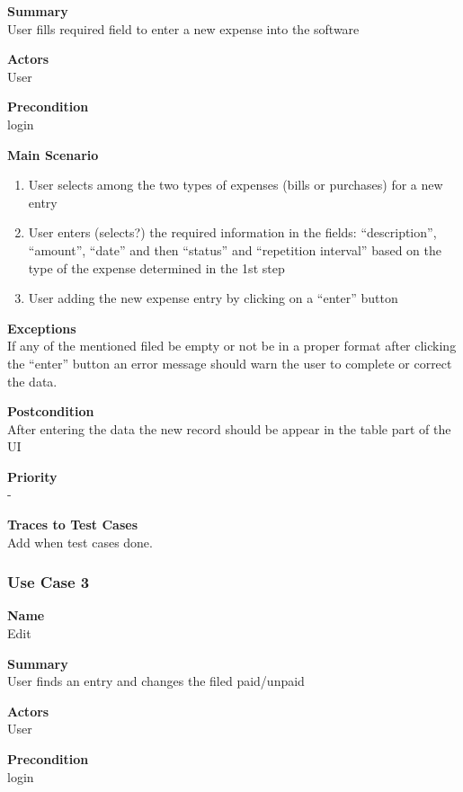 \documentclass[12pt]{article}
\begin{document}
\noindent
{\bf Summary}\\
User fills required field to enter a new expense into the software

\noindent
{\bf Actors}\\
User

\noindent
{\bf Precondition}\\
login

\noindent
{\bf Main Scenario}\\
\vspace*{-0.2in}
\begin{enumerate}
\item User selects among the two types of expenses (bills or purchases) for a new entry
\item User enters (selects?) the required information in the fields: “description”, “amount”,  “date” and then “status” and “repetition interval” based on the type of the expense determined in the 1st step 
\item User adding the new expense entry by clicking on a “enter” button
\end{enumerate}

\noindent
{\bf Exceptions}\\
If any of the mentioned filed be empty or not be in a proper format after clicking the “enter” button an error message should warn the user to complete or correct the data.

\noindent
{\bf Postcondition}\\
 After entering the data the new record should be appear in the table part of the UI

\noindent
{\bf Priority}\\
-

\noindent
{\bf Traces to Test Cases}\\
Add when test cases done.


\subsubsection{Use Case 3} \label{uc:1}		%

\noindent
{\bf Name}\\
Edit

\noindent
{\bf Summary}\\
User finds an entry and changes the filed paid/unpaid

\noindent
{\bf Actors}\\
User

\noindent
{\bf Precondition}\\
login
\end{document}
